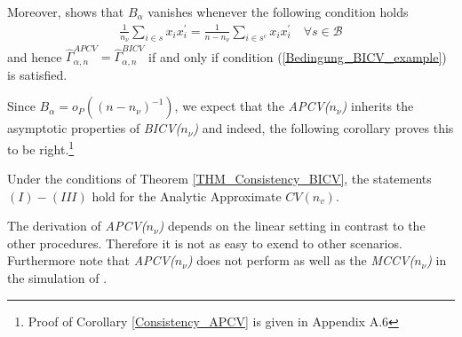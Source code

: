 \documentclass[Research_Module_ES.tex]{subfiles}
\begin{document}
Moreover, \cite{shao} shows that $B_\alpha$ vanishes whenever the following condition holds
\begin{align}
\label{Bedingung_BICV_example}
	\frac{1}{n_\nu}\sum_{i\in s}x_i x_i^\prime=\frac{1}{n-n_\nu}\sum_{i\in s^c}x_i x_i^\prime\quad \forall s\in\mathcal{B}
\end{align}
and hence $\hat{\Gamma}_{\alpha,n}^{APCV}=\hat{\Gamma}_{\alpha,n}^{BICV}$ if and only if condition (\ref{Bedingung_BICV_example}) is satisfied.

Since $B_\alpha=o_P((n-n_\nu)^{-1})$, we expect that the \textit{APCV($n_\nu$)} inherits the asymptotic properties of \textit{BICV($n_\nu$)} and indeed, the following corollary proves this to be right.\footnote{Proof of Corollary \ref{Consistency_APCV} is given in Appendix A.6}
\begin{coro}
\label{Consistency_APCV}
Under the conditions of Theorem \ref{THM_Consistency_BICV}, the statements $(I)-(III)$ hold for the Analytic Approximate $CV(n_v)$.
\end{coro}
The derivation of \textit{APCV($n_\nu$)} depends on the linear setting in contrast to the other procedures. Therefore it is not as easy to exend to other scenarios.
Furthermore note that \textit{APCV($n_\nu$)} does not perform as well as the \textit{MCCV($n_\nu$)} in the simulation of \cite{shao}.
\end{document}
